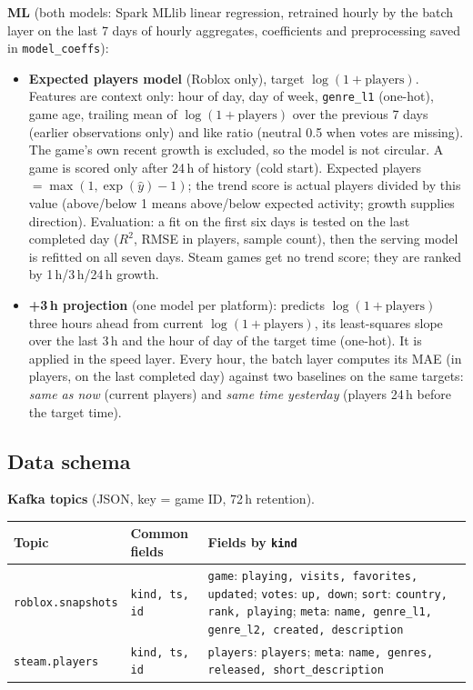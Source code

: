 \documentclass[10pt,a4paper]{article}
\newcommand{\ep}[1]{\texttt{\small #1}}
\begin{document}
\textbf{ML} (both models: Spark MLlib linear regression, retrained hourly by the batch layer on the last 7 days of hourly aggregates, coefficients and preprocessing saved in \ep{model\_coeffs}):
\begin{itemize}
  \item \textbf{Expected players model} (Roblox only), target $\log(1+\text{players})$. Features are context only: hour of day, day of week, \ep{genre\_l1} (one-hot), game age, trailing mean of $\log(1+\text{players})$ over the previous 7 days (earlier observations only) and like ratio (neutral 0.5 when votes are missing). The game's own recent growth is excluded, so the model is not circular. A game is scored only after 24\,h of history (cold start). Expected players $=\max(1,\exp(\widehat{y})-1)$; the trend score is actual players divided by this value (above/below 1 means above/below expected activity; growth supplies direction). Evaluation: a fit on the first six days is tested on the last completed day ($R^2$, RMSE in players, sample count), then the serving model is refitted on all seven days. Steam games get no trend score; they are ranked by 1\,h/3\,h/24\,h growth.
  \item \textbf{+3\,h projection} (one model per platform): predicts $\log(1+\text{players})$ three hours ahead from current $\log(1+\text{players})$, its least-squares slope over the last 3\,h and the hour of day of the target time (one-hot). It is applied in the speed layer. Every hour, the batch layer computes its MAE (in players, on the last completed day) against two baselines on the same targets: \emph{same as now} (current players) and \emph{same time yesterday} (players 24\,h before the target time).
\end{itemize}

\subsection{Data schema}

\textbf{Kafka topics} (JSON, key = game ID, 72\,h retention).

{\small
\begin{longtable}{L{3.0cm} L{2.6cm} L{8.4cm}}
\toprule
\textbf{Topic} & \textbf{Common fields} & \textbf{Fields by \ep{kind}}\\
\midrule\endhead
\ep{roblox.snapshots} & \ep{kind, ts, id} & \ep{game}: \ep{playing, visits, favorites, updated}; \ep{votes}: \ep{up, down}; \ep{sort}: \ep{country, rank, playing}; \ep{meta}: \ep{name, genre\_l1, genre\_l2, created, description}\\
\ep{steam.players} & \ep{kind, ts, id} & \ep{players}: \ep{players}; \ep{meta}: \ep{name, genres, released, short\_description}\\
\bottomrule
\end{longtable}}
\end{document}
